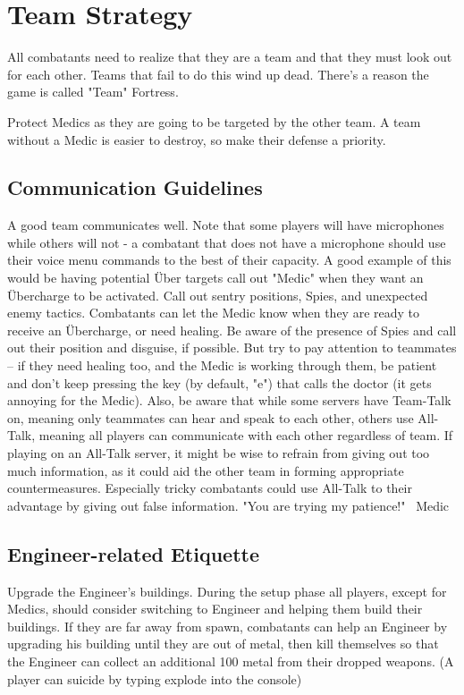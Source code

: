 \section{Team Strategy}
All combatants need to realize that they are a team and that they must look out for each other. Teams that fail to do this wind up dead. There's a reason the game is called "Team" Fortress.

Protect Medics as they are going to be targeted by the other team. A team without a Medic is easier to destroy, so make their defense a priority.

\subsection{Communication Guidelines}
A good team communicates well. Note that some players will have microphones while others will not - a combatant that does not have a microphone should use their voice menu commands to the best of their capacity. A good example of this would be having potential Über targets call out "Medic" when they want an Übercharge to be activated. Call out sentry positions, Spies, and unexpected enemy tactics.  Combatants can let the Medic know when they are ready to receive an Übercharge, or need healing. Be aware of the presence of Spies and call out their position and disguise, if possible. But try to pay attention to teammates -- if they need healing too, and the Medic is working through them, be patient and don't keep pressing the key (by default, "e") that calls the doctor (it gets annoying for the Medic).  Also, be aware that while some servers have Team-Talk on, meaning only teammates can hear and speak to each other, others use All-Talk, meaning all players can communicate with each other regardless of team.  If playing on an All-Talk server, it might be wise to refrain from giving out too much information, as it could aid the other team in forming appropriate countermeasures.  Especially tricky combatants could use All-Talk to their advantage by giving out false information.
"You are trying my patience!" ~Medic

\subsection{Engineer-related Etiquette}
Upgrade the Engineer's buildings.  During the setup phase all players, except for Medics, should consider switching to Engineer and helping them build their buildings. If they are far away from spawn, combatants can help an Engineer by upgrading his building until they are out of metal, then kill
themselves so that the Engineer can collect an additional 100 metal from their dropped weapons. (A player can suicide by typing explode into the console)


